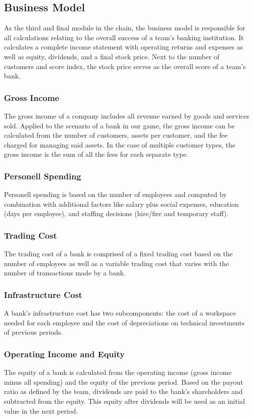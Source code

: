 \subsection{Business Model}
As the third and final module in the chain, the business model is responsible for all calculations relating to the overall success of a team's banking institution. It calculates a complete income statement with operating returns and expenses as well as equity, dividends, and a final stock price. Next to the number of customers and score index, the stock price serves as the overall score of a team's bank.

\subsubsection{Gross Income}
The gross income of a company includes all revenue earned by goods and services sold. Applied to the scenario of a bank in our game, the gross income can be calculated from the number of customers, assets per customer, and the fee charged for managing said assets. In the case of multiple customer types, the gross income is the sum of all the fees for each separate type.

\subsubsection{Personell Spending}
Personell spending is based on the number of employees and computed by combination with additional factors like salary plus social expenses, education (days per employee), and staffing decisions (hire/fire and temporary staff).

\subsubsection{Trading Cost}
The trading cost of a bank is comprised of a fixed trading cost based on the number of employees as well as a variable trading cost that varies with the number of transactions made by a bank.

\subsubsection{Infrastructure Cost}
A bank's infrastructure cost has two subcomponents: the cost of a workspace needed for each employee and the cost of depreciations on technical investments of previous periods.

\subsubsection{Operating Income and Equity}
The equity of a bank is calculated from the operating income (gross income minus all spending) and the equity of the previous period. Based on the payout ratio as defined by the team, dividends are paid to the bank's shareholders and subtracted from the equity. This equity after dividends will be used as an initial value in the next period.

